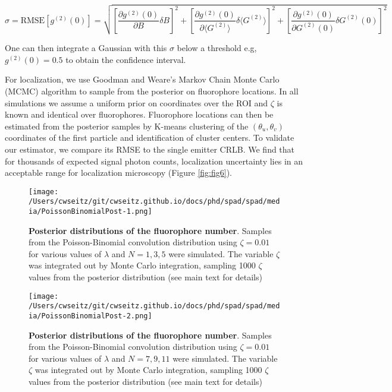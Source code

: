 \begin{equation}
\sigma = \text{RMSE}[g^{(2)}(0)] = \sqrt{
    \left[
    \frac{\partial g^{(2)}(0)}{\partial B} \delta B
    \right]^2 +
    \left[
    \frac{\partial g^{(2)}(0)}{\partial \langle G^{(2)} \rangle} \delta \langle G^{(2)} \rangle
    \right]^2 +
    \left[
    \frac{\partial g^{(2)}(0)}{\partial G^{(2)}(0)} \delta G^{(2)}(0)
    \right]^2
}
\end{equation}

One can then integrate a Gaussian with this $\sigma$ below a threshold e.g, $g^{(2)}(0)=0.5$ to obtain the confidence interval.

For localization, we use Goodman and Weare's Markov Chain Monte Carlo (MCMC) algorithm \parencite{Goodman2010} to sample from the posterior on fluorophore locations. In all simulations we assume a uniform prior on coordinates over the ROI and $\zeta$ is known and identical over fluorophores. Fluorophore locations can then be estimated from the posterior samples by K-means clustering of the $(\theta_u,\theta_v)$ coordinates of the first particle and identification of cluster centers. To validate our estimator, we compare its RMSE to the single emitter CRLB. We find that for thousands of expected signal photon counts, localization uncertainty lies in an acceptable range for localization microscopy (Figure \ref{fig:fig6}).

\begin{figure*}[t]
\centering
\texttt{[image: /Users/cwseitz/git/cwseitz.github.io/docs/phd/spad/spad/media/PoissonBinomialPost-1.png]}
\caption{\textbf{Posterior distributions of the fluorophore number}. Samples from the Poisson-Binomial convolution distribution using $\zeta=0.01$ for various values of $\lambda$ and $N=1,3,5$ were simulated. The variable $\zeta$ was integrated out by Monte Carlo integration, sampling 1000 $\zeta$ values from the posterior distribution (see main text for details)}
\label{fig:fig9}
\end{figure*}    

\begin{figure*}[t]
\centering
\texttt{[image: /Users/cwseitz/git/cwseitz.github.io/docs/phd/spad/spad/media/PoissonBinomialPost-2.png]}
\caption{\textbf{Posterior distributions of the fluorophore number}. Samples from the Poisson-Binomial convolution distribution using $\zeta=0.01$ for various values of $\lambda$ and $N=7,9,11$ were simulated. The variable $\zeta$ was integrated out by Monte Carlo integration, sampling 1000 $\zeta$ values from the posterior distribution (see main text for details)}
\label{fig:fig10}
\end{figure*}    

